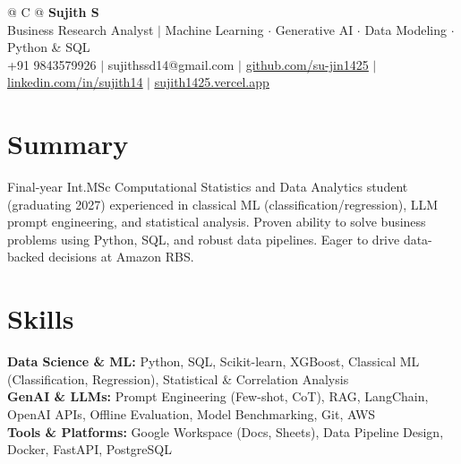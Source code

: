 \documentclass[a4paper,10pt]{article}
\newcommand{\ulink}[2]{\href{#1}{\uline{#2}}}
\begin{document}
\pagestyle{empty}

\begin{tabularx}{\linewidth}{@{} C @{}}
{\color[HTML]{000000}\fontsize{30}{35}\selectfont\bfseries Sujith S} \\[5pt]
{\fontsize{10.5}{12.5}\selectfont\color[HTML]{3A3A3A}
Business Research Analyst $|$ Machine Learning $\cdot$ Generative AI $\cdot$ Data Modeling $\cdot$ Python \& SQL} \\[6pt]
{\fontsize{9.5}{11.5}\selectfont\textcolor[HTML]{3A3A3A}{+91 9843579926 $|$ sujithssd14@gmail.com $|$ \ulink{https://github.com/su-jin1425}{github.com/su-jin1425} $|$ \ulink{https://linkedin.com/in/sujith14}{linkedin.com/in/sujith14} $|$ \ulink{https://sujith1425.vercel.app}{sujith1425.vercel.app}}}
\end{tabularx}

\vspace{2pt}

\section{Summary}
\vspace{3pt}
{\color[HTML]{0A0A0A}\fontsize{11}{14}\selectfont
Final-year Int.MSc Computational Statistics and Data Analytics student (graduating 2027) experienced in classical ML (classification/regression), LLM prompt engineering, and statistical analysis. Proven ability to solve business problems using Python, SQL, and robust data pipelines. Eager to drive data-backed decisions at Amazon RBS.}

\vspace{2pt}

\section{Skills}
\vspace{3pt}
{\color[HTML]{0A0A0A}\fontsize{11}{14}\selectfont
\textbf{Data Science \& ML:} Python, SQL, Scikit-learn, XGBoost, Classical ML (Classification, Regression), Statistical \& Correlation Analysis \\[2pt]
\textbf{GenAI \& LLMs:} Prompt Engineering (Few-shot, CoT), RAG, LangChain, OpenAI APIs, Offline Evaluation, Model Benchmarking, Git, AWS \\[2pt]
\textbf{Tools \& Platforms:} Google Workspace (Docs, Sheets), Data Pipeline Design, Docker, FastAPI, PostgreSQL}

\vspace{2pt}
\end{document}
